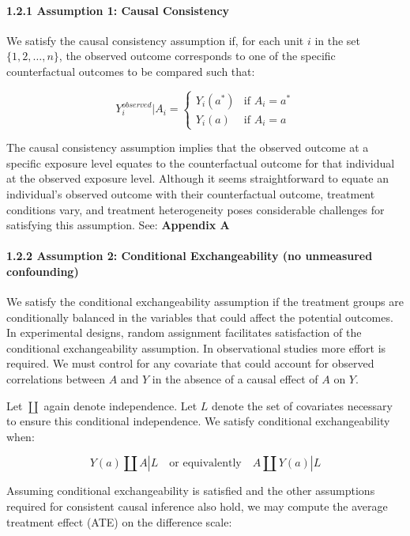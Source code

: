 \documentclass[
  singlecolumn]{article}
\let\oldparagraph\paragraph
\renewcommand{\paragraph}[1]{\oldparagraph{#1}\mbox{}}
\begin{document}
\paragraph{1.2.1 Assumption 1: Causal
Consistency}\label{assumption-1-causal-consistency}

We satisfy the causal consistency assumption if, for each unit \(i\) in
the set \(\{1, 2, \ldots, n\}\), the observed outcome corresponds to one
of the specific counterfactual outcomes to be compared such that:

\[
Y_i^{observed}|A_i = 
\begin{cases} 
Y_i(a^*) & \text{if } A_i = a^* \\
Y_i(a) & \text{if } A_i = a
\end{cases}
\]

The causal consistency assumption implies that the observed outcome at a
specific exposure level equates to the counterfactual outcome for that
individual at the observed exposure level. Although it seems
straightforward to equate an individual's observed outcome with their
counterfactual outcome, treatment conditions vary, and treatment
heterogeneity poses considerable challenges for satisfying this
assumption. See: \textbf{Appendix A}

\paragraph{1.2.2 Assumption 2: Conditional Exchangeability (no
unmeasured
confounding)}\label{assumption-2-conditional-exchangeability-no-unmeasured-confounding}

We satisfy the conditional exchangeability assumption if the treatment
groups are conditionally balanced in the variables that could affect the
potential outcomes. In experimental designs, random assignment
facilitates satisfaction of the conditional exchangeability assumption.
In observational studies more effort is required. We must control for
any covariate that could account for observed correlations between \(A\)
and \(Y\) in the absence of a causal effect of \(A\) on \(Y\).

Let \(\coprod\) again denote independence. Let \(L\) denote the set of
covariates necessary to ensure this conditional independence. We satisfy
conditional exchangeability when:

\[
Y(a) \coprod A | L \quad \text{or equivalently} \quad A \coprod Y(a) | L
\]

Assuming conditional exchangeability is satisfied and the other
assumptions required for consistent causal inference also hold, we may
compute the average treatment effect (ATE) on the difference scale:
\end{document}
